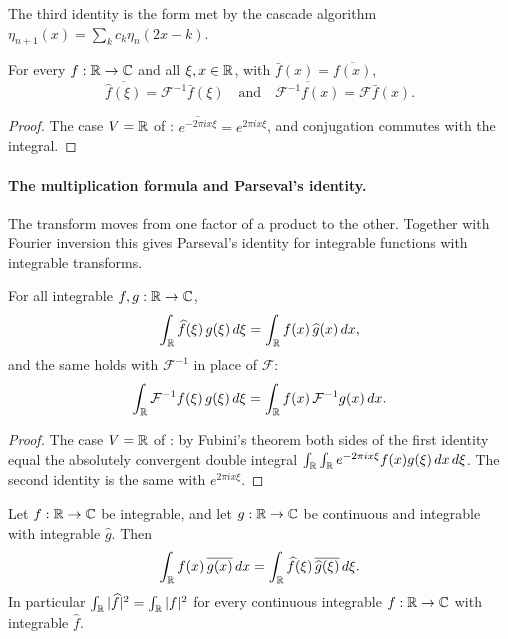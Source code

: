 The third identity is the form met by the cascade algorithm
$\eta_{n+1}(x) = \sum_k c_k \eta_n(2x - k)$.

\begin{lemma}[Conjugation]
\label{lem:daub-fourier-conj}
\leanok
For every $f : \mathbb{R} \to \mathbb{C}$ and all $\xi, x \in \mathbb{R}$, with $\bar f(x) = \overline{f(x)}$,
\[
  \overline{\widehat f(\xi)} = \mathcal F^{-1} \bar f(\xi) \quad\text{and}\quad
  \overline{\mathcal F^{-1} f(x)} = \mathcal F \bar f(x) .
\]
\end{lemma}

\begin{proof}
\leanok
{}
The case $V = \mathbb{R}$ of : $\overline{e^{-2\pi i x \xi}} =
e^{2\pi i x \xi}$, and conjugation commutes with the integral.
\end{proof}

\paragraph{The multiplication formula and Parseval's identity.}
The transform moves from one factor of a product to the other. Together with Fourier inversion
this gives Parseval's identity for integrable functions with integrable transforms.

\begin{proposition}
\label{prop:daub-multiplication-formula}
\leanok
For all integrable $f, g : \mathbb{R} \to \mathbb{C}$,
\[
  \int_{\mathbb{R}} \widehat f(\xi) \, g(\xi) \, d\xi = \int_{\mathbb{R}} f(x) \, \widehat g(x) \, dx ,
\]
and the same holds with $\mathcal F^{-1}$ in place of $\mathcal F$:
\[
  \int_{\mathbb{R}} \mathcal F^{-1} f(\xi) \, g(\xi) \, d\xi = \int_{\mathbb{R}} f(x) \, \mathcal F^{-1} g(x) \, dx .
\]
\end{proposition}

\begin{proof}
\leanok
{}
The case $V = \mathbb{R}$ of : by Fubini's theorem both sides of the first
identity equal the absolutely convergent double integral
$\int_{\mathbb{R}} \int_{\mathbb{R}} e^{-2\pi i x \xi} f(x) g(\xi) \, dx \, d\xi$. The second identity is the same
with $e^{2\pi i x \xi}$.
\end{proof}

\begin{proposition}
\label{prop:daub-parseval}
\leanok
Let $f : \mathbb{R} \to \mathbb{C}$ be integrable, and let $g : \mathbb{R} \to \mathbb{C}$ be continuous and integrable with
integrable $\widehat g$. Then
\[
  \int_{\mathbb{R}} f(x) \, \overline{g(x)} \, dx = \int_{\mathbb{R}} \widehat f(\xi) \, \overline{\widehat g(\xi)}
  \, d\xi .
\]
In particular $\int_{\mathbb{R}} |\widehat f|^2 = \int_{\mathbb{R}} |f|^2$ for every continuous integrable
$f : \mathbb{R} \to \mathbb{C}$ with integrable $\widehat f$.
\end{proposition}


